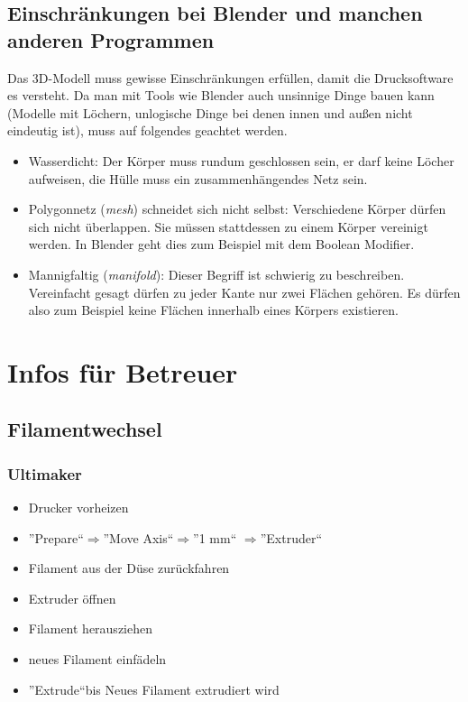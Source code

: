 \documentclass{\basedir/fablab-document}
\newcommand{\fachbegriff}[1]{(\textit{#1})}
\newcommand{\ra}{$\Rightarrow$}
\begin{document}
\subsection{Einschränkungen bei Blender und manchen anderen Programmen} \label{lowlevel-einschraenkungen}

Das 3D-Modell muss gewisse Einschränkungen erfüllen, damit die Drucksoftware es versteht. Da man mit Tools wie Blender auch unsinnige Dinge bauen kann (Modelle mit Löchern, unlogische Dinge bei denen innen und außen nicht eindeutig ist), muss auf folgendes geachtet werden.
\begin{itemize}
\item Wasserdicht: Der Körper muss rundum geschlossen sein, er darf keine
Löcher aufweisen,  die Hülle muss ein zusammenhängendes Netz sein.
\item Polygonnetz \fachbegriff{mesh} schneidet sich nicht selbst: Verschiedene
Körper dürfen sich nicht überlappen. Sie müssen stattdessen zu einem
Körper vereinigt werden. In Blender geht dies zum Beispiel mit dem
Boolean Modifier.
\item Mannigfaltig \fachbegriff{manifold}: Dieser Begriff ist schwierig zu
beschreiben. Vereinfacht gesagt dürfen zu jeder Kante nur zwei Flächen
gehören. Es dürfen also zum Beispiel keine Flächen innerhalb eines
Körpers existieren.
\end{itemize}


\section{Infos für Betreuer}

\subsection{Filamentwechsel}\label{filamentwechsel}

\subsubsection{Ultimaker}
\begin{itemize}
    \item Drucker vorheizen
    \item ''Prepare``\ra ''Move Axis``\ra ''1 mm`` \ra ''Extruder``
    \item Filament aus der Düse zurückfahren
    \item Extruder öffnen
    \item Filament herausziehen
    \item neues Filament einfädeln
    \item ''Extrude``bis Neues Filament extrudiert wird
\end{itemize}
\end{document}

